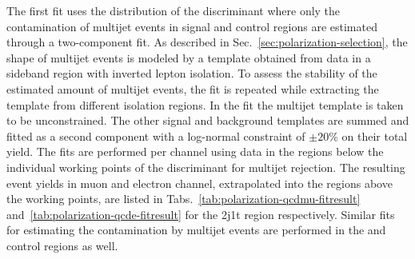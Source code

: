 The first fit uses the distribution of the \bdtqcd discriminant where only the contamination of multijet events in signal and control regions are estimated through a two-component fit. As described in Sec.~\ref{sec:polarization-selection}, the shape of multijet events is modeled by a template obtained from data in a sideband region with inverted lepton isolation. To assess the stability of the estimated amount of multijet events, the fit is repeated while extracting the template from different isolation regions. In the fit the multijet template is taken to be unconstrained. The other signal and background templates are summed and fitted as a second component with a log-normal constraint of $\pm20\%$ on their total yield. The fits are performed per channel using data in the regions below the individual working points of the \bdtqcd discriminant for multijet rejection. The resulting event yields in muon and electron channel, extrapolated into the regions above the working points, are listed in Tabs.~\ref{tab:polarization-qcdmu-fitresult} and~\ref{tab:polarization-qcde-fitresult} for the 2j1t region respectively. Similar fits for estimating the contamination by multijet events are performed in the \wjets and \ttbar control regions as well.


